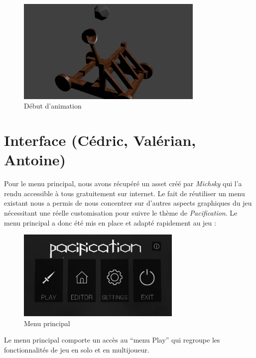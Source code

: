 \documentclass[12pt]{report}
\begin{document}
\begin{figure}[H]
    \centering
    \includegraphics[width=0.8\textwidth]{CatapulteAnimation}
    \caption{Début d'animation}
\end{figure}

\newpage

\section{Interface (Cédric, Valérian, Antoine)}

Pour le menu principal, nous avons récupéré un asset créé par \textit{Michsky}
qui l’a rendu accessible à tous gratuitement sur internet. Le fait de
réutiliser un menu existant nous a permis de nous concentrer sur d'autres
aspects graphiques du jeu nécessitant une réelle customisation pour suivre le
thème de \textit{Pacification}. Le menu principal a donc été mis en place et
adapté rapidement au jeu :

\begin{figure}[H]
    \centering
    \includegraphics[width=0.7\textwidth]{MainMenuScreen}
    \caption{Menu principal}
\end{figure}

Le menu principal comporte un accès au “menu Play” qui regroupe les
fonctionnalités de jeu en solo et en multijoueur.
\end{document}

